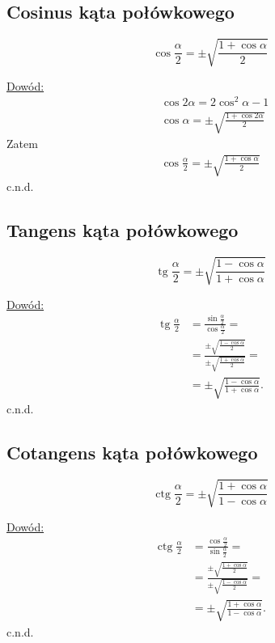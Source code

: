 \documentclass[12pt,a4paper,fleqn]{article}
\DeclareMathOperator{\tg}{tg}
\DeclareMathOperator{\ctg}{ctg}
\begin{document}
	\subsection{Cosinus kąta połówkowego}
		\begin{equation*}
			\cos\frac{\alpha}{2} = \pm \sqrt{\frac{1+\cos\alpha}{2}}
		\end{equation*}
		
		\underline{Dowód:} \noindent
		\begin{align*}
			&\cos 2\alpha = 2\cos^2\alpha - 1\\
			&\cos\alpha = \pm \sqrt{\frac{1+\cos2\alpha}{2}}
		\end{align*}
		Zatem
		\begin{align*}
			\cos\frac{\alpha}{2} = \pm \sqrt{\frac{1+\cos\alpha}{2}}
		\end{align*}
		c.n.d.
		
	\subsection{Tangens kąta połówkowego}
		\begin{equation*}
			\tg\frac{\alpha}{2} = \pm \sqrt{\frac{1-\cos\alpha}{1+\cos\alpha}}
		\end{equation*}
		
		\underline{Dowód:} \noindent
		\begin{align*}
			\tg\frac{\alpha}{2} &= \frac{\sin\frac{\alpha}{2}}{\cos\frac{\alpha}{2}} =\\
								&= \frac{\pm \sqrt{\frac{1-\cos\alpha}{2}}}{\pm \sqrt{\frac{1+\cos\alpha}{2}}} =\\
								&= \pm \sqrt{\frac{1-\cos\alpha}{1+\cos\alpha}}.
		\end{align*}
		c.n.d.

	\subsection{Cotangens kąta połówkowego}
		\begin{equation*}
			\ctg\frac{\alpha}{2} = \pm \sqrt{\frac{1+\cos\alpha}{1-\cos\alpha}}
		\end{equation*}
		
		\underline{Dowód:} \noindent
		\begin{align*}
			\ctg\frac{\alpha}{2} &= \frac{\cos\frac{\alpha}{2}}{\sin\frac{\alpha}{2}} =\\
								 &= \frac{\pm \sqrt{\frac{1+\cos\alpha}{2}}}{\pm \sqrt{\frac{1-\cos\alpha}{2}}} =\\
								 &= \pm \sqrt{\frac{1+\cos\alpha}{1-\cos\alpha}}.
		\end{align*}
		c.n.d.
\end{document}
